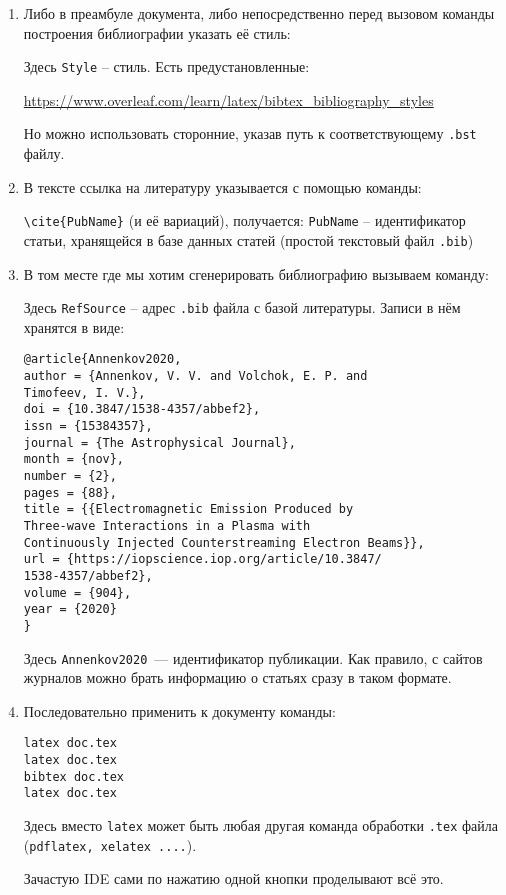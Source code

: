 \begin{enumerate}
	\item Либо в преамбуле документа, либо непосредственно перед вызовом команды построения библиографии указать её стиль:  
	
	\verb||
	
	Здесь \verb|Style| -- стиль. Есть предустановленные:
	
	\href{https://www.overleaf.com/learn/latex/bibtex_bibliography_styles}{https://www.overleaf.com/learn/latex/bibtex\_bibliography\_styles}
	
	Но можно использовать сторонние, указав путь к соответствующему \verb|.bst| файлу.
	\item В тексте ссылка на литературу указывается с помощью команды: 
	
	\verb|\cite{PubName}| (и её вариаций), получается: \cite{Annenkov2020,Annenkov2019,Annenkov2019d}
	\verb|PubName| -- идентификатор статьи, хранящейся в базе данных статей (простой текстовый файл \verb|.bib|)
	
	\item В том месте где мы хотим сгенерировать библиографию вызываем команду:
	
	\verb||
	
	Здесь \verb|RefSource| -- адрес  \verb|.bib| файла с базой литературы. Записи в нём хранятся в виде:
	
\begin{small}
	\begin{verbatim}
@article{Annenkov2020,
author = {Annenkov, V. V. and Volchok, E. P. and 
Timofeev, I. V.},
doi = {10.3847/1538-4357/abbef2},
issn = {15384357},
journal = {The Astrophysical Journal},
month = {nov},
number = {2},
pages = {88},
title = {{Electromagnetic Emission Produced by 
Three-wave Interactions in a Plasma with 
Continuously Injected Counterstreaming Electron Beams}},
url = {https://iopscience.iop.org/article/10.3847/
1538-4357/abbef2},
volume = {904},
year = {2020}
}
	\end{verbatim}
\end{small}

Здесь \verb|Annenkov2020|~--- идентификатор публикации. Как правило, с сайтов журналов можно брать информацию о статьях сразу в таком формате.

\item  Последовательно применить к документу команды:

\begin{verbatim}
latex doc.tex
latex doc.tex
bibtex doc.tex
latex doc.tex
\end{verbatim}

Здесь вместо \texttt{latex} может быть любая другая команда обработки \texttt{.tex} файла (\texttt{pdflatex, xelatex ....}). 

Зачастую IDE сами по нажатию одной кнопки проделывают всё это.
\end{enumerate}

